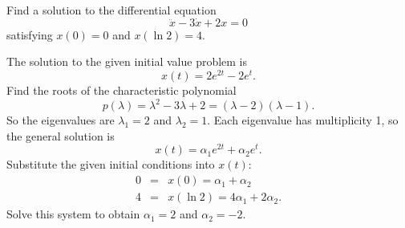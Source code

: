 \documentclass{ximera}
\begin{document}
\begin{exercise} \label{c12.2.a6}
Find a solution to the differential equation 
\[
\ddot{x} -3\dot{x} + 2x = 0
\]
satisfying $x(0)=0$ and $x(\ln 2) = 4$.

\begin{solution}
\ans The solution to the given initial value problem is
\[
x(t) = 2e^{2t} - 2e^t.
\]
\soln Find the roots of the characteristic polynomial
\[
p(\lambda) = \lambda^2 - 3\lambda + 2 = (\lambda - 2)(\lambda - 1).
\]
So the eigenvalues are $\lambda_1 = 2$ and $\lambda_2 = 1$.  Each eigenvalue
has multiplicity 1, so the general solution is
\[
x(t) = \alpha_1e^{2t} + \alpha_2e^t.
\]
Substitute the given initial conditions into $x(t)$:
\[
\begin{array}{rcl}
0 & = & x(0) = \alpha_1 + \alpha_2 \\
4 & = & x(\ln 2) = 4\alpha_1 + 2\alpha_2.
\end{array}
\]
Solve this system to obtain $\alpha_1 = 2$ and $\alpha_2 = -2$.

\end{solution}
\end{exercise}
\end{document}
